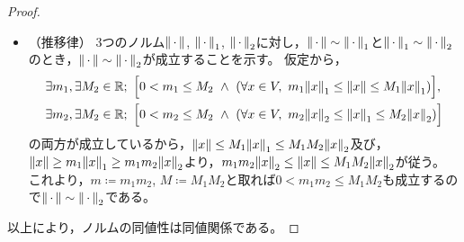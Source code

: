 \documentclass[b5paper,draft,oneside,openany]{ltjsbook} %
\begin{document}
\begin{prop}
\begin{proof}
\begin{itemize}
            \item （推移律）
            3つのノルム$\norm{\dummy}$, $\norm{\dummy}_1$, $\norm{\dummy}_2$に対し，$\norm{\dummy}\sim \norm{\dummy}_1$と$\norm{\dummy}_1\sim \norm{\dummy}_2$のとき，$\norm{\dummy}\sim \norm{\dummy}_2$が成立することを示す。
            仮定から，
            \begin{align}
                &\exists m_1, \exists M_2\in\R;\ \bsqu{0<m_1\leq M_2\ \land \ \pare{
                \forall x\in V,\ m_1\norm{x}_1 \leq \norm{x} \leq M_1\norm{x}_1
                }},
                \\
                &\exists m_2, \exists M_2\in\R;\ \bsqu{0<m_2\leq M_2\ \land \ \pare{
                \forall x\in V,\ m_2\norm{x}_2 \leq \norm{x}_1 \leq M_2\norm{x}_2
                }}
            \end{align}
            の両方が成立しているから，$\norm{x}\leq M_1\norm{x}_1\leq M_1M_2\norm{x}_2$及び，$\norm{x}\geq m_1\norm{x}_1\geq m_1m_2 \norm{x}_2$より，$m_1m_2\norm{x}_2\leq \norm{x}\leq M_1M_2\norm{x}_2$が従う。
            これより，$m\coloneqq m_1m_2$, $M\coloneqq M_1M_2$と取れば$0<m_1m_2\leq M_1M_2$も成立するので$\norm{\dummy}\sim \norm{\dummy}_2$である。
        \end{itemize}

        以上により，ノルムの同値性は同値関係である。
    \end{proof}
\end{prop}
\end{document}
